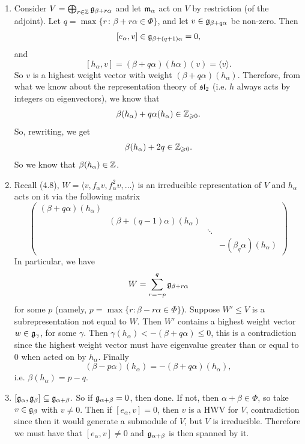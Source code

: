 \documentclass{article}
\begin{document}
\begin{enumerate}
    \item Consider $V = \bigoplus_{r \in \mathbb{Z}} \mathfrak{g}_{\beta + r \alpha}$ and let $\mathfrak{m}_{\alpha}$ act on $V$ by restriction (of the adjoint). Let $q = \max \{ r \, : \, \beta + r \alpha \in \Phi \}$, and let $v \in \mathfrak{g}_{\beta + q \alpha}$ be non-zero. Then \[ [e_{\alpha}, v] \in \mathfrak{g}_{\beta + (q+1)\alpha} = 0, \] and \[ [h_{\alpha},v] = (\beta + q \alpha)(h \alpha) (v) = \langle v \rangle.\] So $v$ is a highest weight vector with weight $(\beta + q \alpha)(h_{\alpha})$. Therefore, from what we know about the representation theory of $\mathfrak{sl}_{2}$ (i.e. $h$ always acts by integers on eigenvectors), we know that \[\beta(h_{\alpha}) + q\alpha(h_{\alpha}) \in \mathbb{Z}_{\geqslant 0}.\] So, rewriting, we get \[\beta(h_{\alpha}) + 2q \in \mathbb{Z}_{\geqslant 0}.\] So we know that $\beta(h_{\alpha}) \in \mathbb{Z}$.
    \item Recall (4.8), $W=\langle v, f_{\alpha}v, f_{\alpha}^{2}v, \dots \rangle$ is an irreducible representation of $V$ and $h_{\alpha}$ acts on it via the following matrix \[ \begin{pmatrix}
        (\beta + q\alpha)(h_{\alpha}) & & &\\
        & (\beta + (q-1) \alpha)(h_{\alpha}) & &\\
        & & \ddots & \\
        & & & -(\beta _ q \alpha)(h_{\alpha})
    \end{pmatrix}\]
    In particular, we have \[ W= \sum_{r=-p}^{q} \mathfrak{g}_{\beta+r\alpha}\] for some $p$ (namely, $p = \max \{ r : \beta - r\alpha \in \Phi\}$). Suppose $W' \leq V$ is a subrepresentation not equal to $W$. Then $W'$ contains a highest weight vector $w \in \mathfrak{g}_{\gamma}$, for some $\gamma$. Then $\gamma(h_{\alpha}) < -(\beta + q \alpha) \leq 0$, this is a contradiction since the highest weight vector must have eigenvalue greater than or equal to $0$ when acted on by $h_{\alpha}$. Finally \[ (\beta -p \alpha)(h_{\alpha}) = -(\beta + q\alpha)(h_{\alpha}),\] i.e. $\beta(h_{\alpha}) = p-q$.
    





    \item \newlec $[\mathfrak{g}_{\alpha},\mathfrak{g}_{\beta}] \subseteq \mathfrak{g}_{\alpha + \beta}.$ So if $\mathfrak{g}_{\alpha+\beta}=0$, then done. If not, then $\alpha + \beta \in \Phi$, so take $v \in \mathfrak{g}_{\beta}$ with $v \neq 0$. Then if $[e_{\alpha},v]=0$, then $v$ is a HWV for $V$, contradiction since then it would generate a submodule of $V$, but $V$ is irreducible. Therefore we must have that $[e_{\alpha},v]\neq 0$ and $\mathfrak{g}_{\alpha + \beta}$ is then spanned by it.
\end{enumerate}
\end{document}
